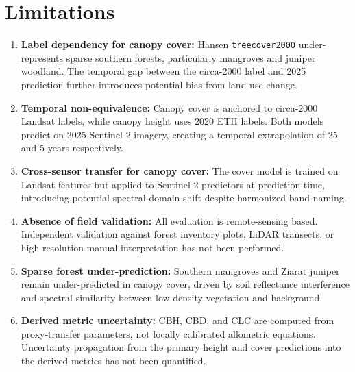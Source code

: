 \documentclass[12pt,a4paper,twoside]{article}
\begin{document}
\section{Limitations}\label{sec:limitations}

\begin{enumerate}
  \item \textbf{Label dependency for canopy cover:} Hansen \texttt{treecover2000}
    under-represents sparse southern forests, particularly mangroves and juniper
    woodland.  The temporal gap between the circa-2000 label and 2025 prediction
    further introduces potential bias from land-use change.

  \item \textbf{Temporal non-equivalence:} Canopy cover is anchored to circa-2000
    Landsat labels, while canopy height uses 2020 ETH labels.  Both models predict
    on 2025 Sentinel-2 imagery, creating a temporal extrapolation of 25 and 5 years
    respectively.

  \item \textbf{Cross-sensor transfer for canopy cover:} The cover model is trained
    on Landsat features but applied to Sentinel-2 predictors at prediction time,
    introducing potential spectral domain shift despite harmonized band naming.

  \item \textbf{Absence of field validation:} All evaluation is remote-sensing
    based.  Independent validation against forest inventory plots, LiDAR transects,
    or high-resolution manual interpretation has not been performed.

  \item \textbf{Sparse forest under-prediction:} Southern mangroves and Ziarat
    juniper remain under-predicted in canopy cover, driven by soil reflectance
    interference and spectral similarity between low-density vegetation and
    background.

  \item \textbf{Derived metric uncertainty:} CBH, CBD, and CLC are computed from
    proxy-transfer parameters, not locally calibrated allometric equations.
    Uncertainty propagation from the primary height and cover predictions into the
    derived metrics has not been quantified.
\end{enumerate}

\end{document}
